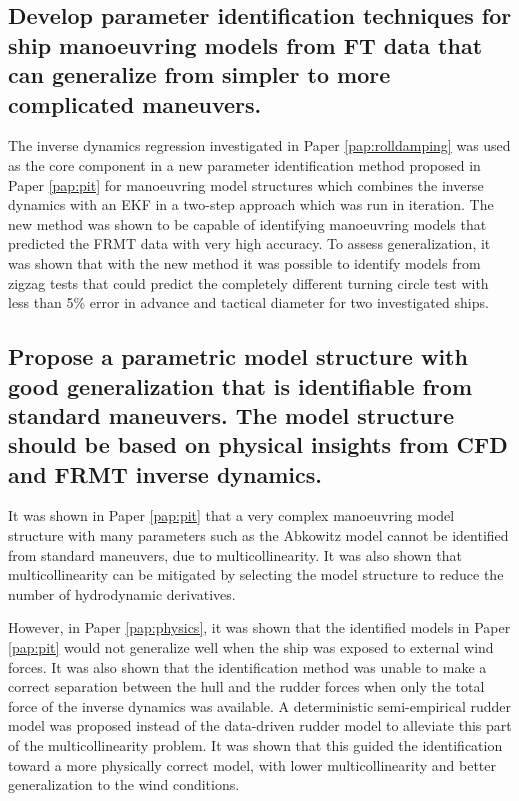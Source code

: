 \subsection*{Develop parameter identification techniques for ship manoeuvring models from FT data that can generalize from simpler to more complicated maneuvers.}
The inverse dynamics regression investigated in Paper \ref{pap:rolldamping} was used as the core component in a new parameter identification method proposed in Paper \ref{pap:pit} for manoeuvring model structures which combines the inverse dynamics with an EKF in a two-step approach \cite{yoonIdentificationHydrodynamicCoefficients2003} which was run in iteration.
The new method was shown to be capable of identifying manoeuvring models that predicted the FRMT data with very high accuracy.
To assess generalization, it was shown that with the new method it was possible to identify models from zigzag tests that could predict the completely different turning circle test with less than 5\% error in advance and tactical diameter for two investigated ships.

\subsection*{Propose a parametric model structure with good generalization that is identifiable from standard maneuvers. The model structure should be based on physical insights from CFD and FRMT inverse dynamics.}
It was shown in Paper \ref{pap:pit}  that a very complex manoeuvring model structure with many parameters such as the Abkowitz model cannot be identified from standard maneuvers, due to multicollinearity.  
It was also shown that multicollinearity can be mitigated by selecting the model structure to reduce the number of hydrodynamic derivatives.

However, in Paper \ref{pap:physics}, it was shown that the identified models in Paper \ref{pap:pit} would not generalize well when the ship was exposed to external wind forces. 
It was also shown that the identification method was unable to make a correct separation between the hull and the rudder forces when only the total force of the inverse dynamics was available. 
A deterministic semi-empirical rudder model was proposed instead of the data-driven rudder model to alleviate this part of the multicollinearity problem. It was shown that this guided the identification toward a more physically correct model, with lower multicollinearity and better generalization to the wind conditions. 

